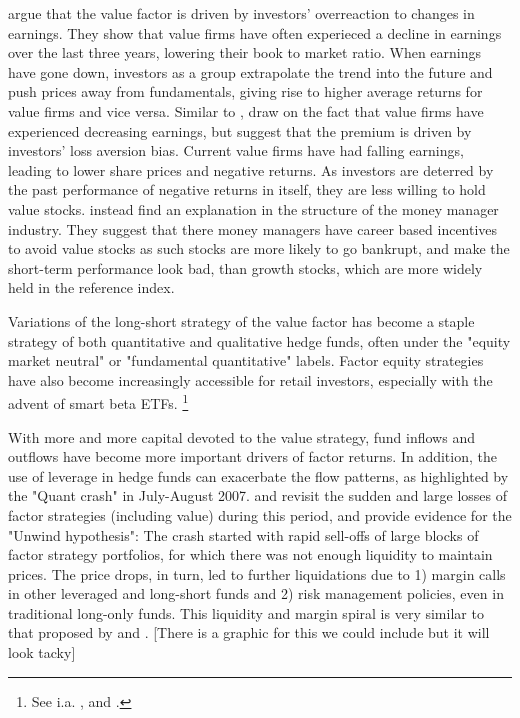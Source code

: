 \textcite{LakonishokShleiferVishny1994} argue that the value factor is driven by investors' overreaction to changes in earnings. They show that value firms have often experieced a decline in earnings over the last three years, lowering their book to market ratio. When earnings have gone down, investors as a group extrapolate the trend into the future and push prices away from fundamentals, giving rise to higher average returns for value firms and vice versa. Similar to \textcite{LakonishokShleiferVishny1994}, \textcite{BarberisHuang2001} draw on the fact that value firms have experienced decreasing earnings, but suggest that the premium is driven by investors' loss aversion bias. Current value firms have had falling earnings, leading to lower share prices and negative returns. As investors are deterred by the past performance of negative returns in itself, they are less willing to hold value stocks. \textcite{LakonishokShleiferVishny1992} instead find an explanation in the structure of the money manager industry. They suggest that there money managers have career based incentives to avoid value stocks as such stocks are more likely to go bankrupt, and make the short-term performance look bad, than growth stocks, which are more widely held in the reference index.

Variations of the long-short strategy of the value factor has become a staple strategy of both quantitative and qualitative hedge funds, often under the "equity market neutral" or "fundamental quantitative" labels. Factor equity strategies have also become increasingly accessible for retail investors, especially with the advent of smart beta ETFs. \footnote{See i.a. \textcite{Pedersen2015}, \textcite{AQREMN} and \textcite{McKEMN}.} 

With more and more capital devoted to the value strategy, fund inflows and outflows have become more important drivers of factor returns. In addition, the use of leverage in hedge funds can exacerbate the flow patterns, as highlighted by the "Quant crash" in July-August 2007. \textcite{KhandaniLo2011} and \textcite{KhandaniLo2007} revisit the sudden and large losses of factor strategies (including value) during this period, and provide evidence for the "Unwind hypothesis": The crash started with rapid sell-offs of large blocks of factor strategy portfolios, for which there was not enough liquidity to maintain prices. The price drops, in turn, led to further liquidations due to 1) margin calls in other leveraged and long-short funds and 2) risk management policies, even in traditional long-only funds. This liquidity and margin spiral is very similar to that proposed by \textcite{Brunnermeier2009} and \textcite{BrunnermeierPedersen2009}. [There is a graphic for this we could include but it will look tacky]

